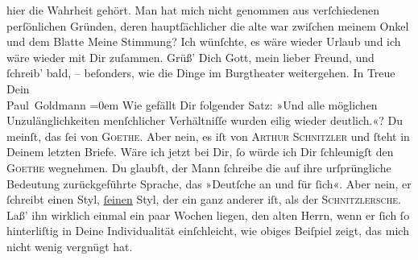 \begin{ledgroupsized}[t]{13cm}
               hier die Wahrheit gehört. Man hat mich nicht genommen aus verſchiedenen {\pb}perſönlichen Gründen, deren hauptſächlicher die alte
                  \label{K_L02748-111v}\label{K_L02748-111h} war zwiſchen meinem Onkel und dem Blatte\pend
           \pstart
           Meine Stimmung? Ich wünſchte, es wäre wieder Urlaub und ich wäre wieder mit Dir
               zuſammen.\pend
           \pstart
           Grüß’ Dich Gott, mein lieber Freund, und ſchreib’ bald, – beſonders, wie die Dinge im
                  Burgtheater weitergehen.\pend
           \pstart
           In Treue {\\[\baselineskip]}Dein {\\[\baselineskip]}\spacefill\mbox{Paul Goldmann}\pend
           \leftskip=0em{}\pstart
           \noindent{}Wie gefällt Dir folgender Satz: »Und alle möglichen Unzulänglichkeiten
                  menſchlicher Verhältniſſe wurden eilig wieder deutlich.«? Du meinſt, das ſei von
                     \textsc{Goethe}. Aber nein, es iſt von \textsc{Arthur Schnitzler} und ſteht
                  in Deinem letzten Briefe. Wäre ich jetzt bei Dir, ſo würde ich Dir ſchleunigſt den
                     \textsc{Goethe} wegnehmen. Du glaubſt, der Mann ſchreibe  die auf ihre urſprüngliche Bedeutung zurückgeführte Sprache, das »Deutſche
                  an {\pb}und für ſich«. Aber nein, er ſchreibt einen
                  Styl, \uline{ſeinen} Styl, der ein ganz anderer iſt, als
                  der \textsc{Schnitzlersche}. Laß’ ihn wirklich einmal ein paar
                  Wochen liegen, den alten Herrn, wenn er ſich ſo hinterliſtig in Deine
                  Individualität einſchleicht, wie obiges Beiſpiel zeigt, das mich nicht wenig
                  vergnügt hat.\pend
           
         
         \endnumbering{}\end{ledgroupsized}  \newcommand{\dateiname}{L02748}\newcommand{\titel}{Paul Goldmann an Arthur Schnitzler, 23. 9. [1895]}\newcommand{\editorInnen}{Martin Anton Müller und Laura Untner}
      